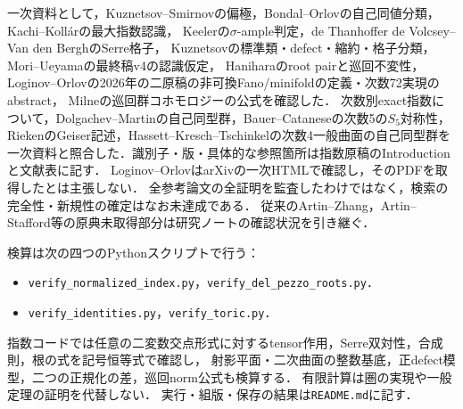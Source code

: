\documentclass[11pt,a4paper]{ltjsarticle}
\begin{document}
一次資料として，Kuznetsov--Smirnovの偏極，Bondal--Orlovの自己同値分類，Kachi--Koll\'arの最大指数認識，
Keelerの$\sigma$-ample判定，de Thanhoffer de Volcsey--Van den BerghのSerre格子，
Kuznetsovの標準類・defect・縮約・格子分類，Mori--Ueyamaの最終稿v4の認識仮定，
Haniharaのroot pairと巡回不変性，Loginov--Orlovの2026年の二原稿の非可換Fano/minifoldの定義・次数72実現のabstract，
Milneの巡回群コホモロジーの公式を確認した．
次数別exact指数について，Dolgachev--Martinの自己同型群，Bauer--Cataneseの次数5の$S_5$対称性，RiekenのGeiser記述，Hassett--Kresch--Tschinkelの次数4一般曲面の自己同型群を一次資料と照合した．識別子・版・具体的な参照箇所は指数原稿のIntroductionと文献表に記す．
Loginov--OrlovはarXivの一次HTMLで確認し，そのPDFを取得したとは主張しない．
全参考論文の全証明を監査したわけではなく，検索の完全性・新規性の確定はなお未達成である．
従来のArtin--Zhang，Artin--Stafford等の原典未取得部分は研究ノートの確認状況を引き継ぐ．

検算は次の四つのPythonスクリプトで行う：
\begin{itemize}
\item \texttt{verify\_normalized\_index.py}，\texttt{verify\_del\_pezzo\_roots.py}．
\item \texttt{verify\_identities.py}，\texttt{verify\_toric.py}．
\end{itemize}
指数コードでは任意の二変数交点形式に対するtensor作用，Serre双対性，合成則，根の式を記号恒等式で確認し，
射影平面・二次曲面の整数基底，正defect模型，二つの正規化の差，巡回norm公式も検算する．
有限計算は圏の実現や一般定理の証明を代替しない．
実行・組版・保存の結果は\texttt{README.md}に記す．

\begingroup\small
\end{document}
